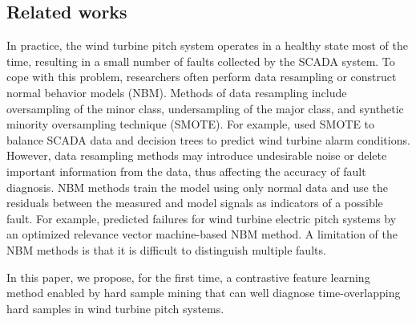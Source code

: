 \documentclass[lettersize,journal]{IEEEtran}
\begin{document}
\subsection{Related works}%
In practice, the wind turbine pitch system operates in a healthy state most of the time, resulting in a small number of faults collected by the SCADA system. To cope with this problem, researchers often perform data resampling or construct normal behavior models (NBM). Methods of data resampling include oversampling of the minor class\cite{yang2023fault}, undersampling of the major class\cite{lin2017clustering}, and synthetic minority oversampling technique 
 (SMOTE)\cite{zhang2018imbalanced}. For example, \citet{9461331} used SMOTE to balance SCADA data and decision trees to predict wind turbine alarm conditions. However, data resampling methods may introduce undesirable noise or delete important information from the data, thus affecting the accuracy of fault diagnosis. NBM methods train the model using only normal data and use the residuals between the measured and model signals as indicators of a possible fault\cite{tautz2017using}. For example, \citet{wei2019wind} predicted failures for wind turbine electric pitch systems by an optimized relevance vector machine-based NBM method. A limitation of the NBM methods is that it is difficult to distinguish multiple faults. %
 
 In this paper, we propose, for the first time, a contrastive feature learning method enabled by hard sample mining that can well diagnose time-overlapping hard samples in wind turbine pitch systems.

\end{document}
